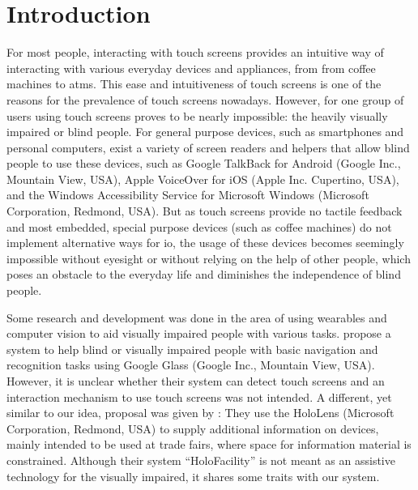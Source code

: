 \section{Introduction}

For most people, interacting with touch screens provides an intuitive way of interacting with various everyday devices and appliances, from from coffee machines to \acp{atm}.
This ease and intuitiveness of touch screens is one of the reasons for the prevalence of touch screens nowadays.
However, for one group of users using touch screens proves to be nearly impossible: the heavily visually impaired or blind people.
For general purpose devices, such as smartphones and personal computers, exist a variety of screen readers and helpers that allow blind people to use these devices, such as Google TalkBack for Android \cite{talkback} (Google Inc., Mountain View, USA), Apple VoiceOver for iOS \cite{voiceover} (Apple Inc. Cupertino, USA), and the Windows Accessibility Service for Microsoft Windows \cite{windowsaccessibility} (Microsoft Corporation, Redmond, USA). 
But as touch screens provide  no tactile feedback and most embedded, special purpose devices (such as coffee machines) do not implement alternative ways for \ac{io}, the usage of these devices becomes seemingly impossible without eyesight or without relying on the help of other people, which poses an obstacle to the everyday life and diminishes the independence of blind people.

Some research and development was done in the area of using wearables and computer vision to aid visually impaired people with various tasks.
\textcite{googleglass} propose a system to help blind or visually impaired people with basic navigation and recognition tasks using Google Glass (Google Inc., Mountain View, USA).
However, it is unclear whether their system can detect touch screens and an interaction mechanism to use touch screens was not intended.
A different, yet similar to our idea, proposal was given by \textcite{holofacility}: They use the HoloLens (Microsoft Corporation, Redmond, USA) to supply additional information on devices, mainly intended to be used at trade fairs, where space for information material is constrained.
Although their system \enquote{HoloFacility} is not meant as an assistive technology for the visually impaired, it shares some traits with our system.

